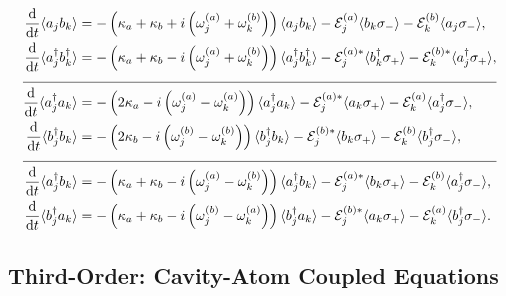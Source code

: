 \documentclass{article}
\newcommand{\ddt}[1][]{\frac{\mathrm{d} #1}{\mathrm{d}t}}
\begin{document}
\begin{subequations}
	\begin{align}
		\ddt \langle a_{j} b_{k} \rangle &= -\left( \kappa_{a} + \kappa_{b} + i \left( \omega_{j}^{(a)} + \omega_{k}^{(b)} \right) \right) \langle a_{j} b_{k} \rangle - \mathcal{E}_{j}^{(a)} \langle b_{k} \sigma_{-} \rangle - \mathcal{E}_{k}^{(b)} \langle a_{j} \sigma_{-} \rangle, \\
		\ddt \langle a^{\dagger}_{j} b^{\dagger}_{k} \rangle &= -\left( \kappa_{a} + \kappa_{b} - i \left( \omega_{j}^{(a)} + \omega_{k}^{(b)} \right) \right) \langle a^{\dagger}_{j} b^{\dagger}_{k} \rangle - \mathcal{E}_{j}^{(a) *} \langle b^{\dagger}_{k} \sigma_{+} \rangle - \mathcal{E}_{k}^{(b) *} \langle a^{\dagger}_{j} \sigma_{+} \rangle, \\
		\cline{1-2}
		\ddt \langle a^{\dagger}_{j} a_{k} \rangle &= -\left( 2 \kappa_{a} - i \left( \omega_{j}^{(a)}- \omega_{k}^{(a)} \right) \right) \langle a^{\dagger}_{j} a_{k} \rangle - \mathcal{E}_{j}^{(a) *} \langle a_{k} \sigma_{+} \rangle - \mathcal{E}_{k}^{(a)} \langle a^{\dagger}_{j} \sigma_{-} \rangle, \\
		\ddt \langle b^{\dagger}_{j} b_{k} \rangle &= -\left( 2 \kappa_{b} - i \left( \omega_{j}^{(b)}- \omega_{k}^{(b)} \right) \right) \langle b^{\dagger}_{j} b_{k} \rangle - \mathcal{E}_{j}^{(b) *} \langle b_{k} \sigma_{+} \rangle - \mathcal{E}_{k}^{(b)} \langle b^{\dagger}_{j} \sigma_{-} \rangle, \\
		\cline{1-2}
		\ddt \langle a^{\dagger}_{j} b_{k} \rangle &= -\left( \kappa_{a} + \kappa_{b} - i \left( \omega_{j}^{(a)}- \omega_{k}^{(b)} \right) \right) \langle a^{\dagger}_{j} b_{k} \rangle - \mathcal{E}_{j}^{(a) *} \langle b_{k} \sigma_{+} \rangle - \mathcal{E}_{k}^{(b)} \langle a^{\dagger}_{j} \sigma_{-} \rangle, \\
		\ddt \langle b^{\dagger}_{j} a_{k} \rangle &= -\left( \kappa_{a} + \kappa_{b} - i \left( \omega_{j}^{(b)}- \omega_{k}^{(a)} \right) \right) \langle b^{\dagger}_{j} a_{k} \rangle - \mathcal{E}_{j}^{(b) *} \langle a_{k} \sigma_{+} \rangle - \mathcal{E}_{k}^{(a)} \langle b^{\dagger}_{j} \sigma_{-} \rangle.
	\end{align}
\end{subequations}

\subsection{Third-Order: Cavity-Atom Coupled Equations}
\end{document}
